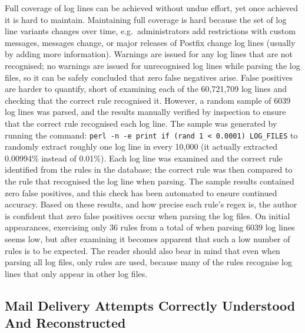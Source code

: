 Full coverage of log lines can be achieved without undue effort, yet once
achieved it is hard to maintain.  Maintaining full coverage is hard because
the set of log line variants changes over time, e.g.\ administrators add
restrictions with custom messages,  messages change, or
major releases of Postfix change log lines (usually by adding more
information).  Warnings are issued for any log lines that are not
recognised; no warnings are issued for unrecognised log lines while parsing
the \numberOFlogFILES{} log files, so it can be safely concluded that zero
false negatives arise.  False positives are harder to quantify, short of
examining each of the 60,721,709 log lines and checking that the correct
rule recognised it.  However, a random sample of 6039 log lines was parsed,
and the results manually verified by inspection to ensure that the correct
rule recognised each log line.  The sample was generated by running the
command: \texttt{perl -n -e \singlequote{}print if (rand 1 <
0.0001)\singlequote{} LOG\_FILES} to randomly extract roughly one log line
in every 10,000 (it actually extracted 0.00994\% instead of 0.01\%).  Each
log line was examined and the correct rule identified from the
\numberOFrules{} rules in the database; the correct rule was then compared
to the rule that recognised the log line when parsing.  The sample results
contained zero false positives, and this check has been automated to ensure
continued accuracy.  Based on these results, and how precise each rule's
regex is, the author is confident that zero false positives occur when
parsing the \numberOFlogFILES{} log files.  On initial appearances,
exercising only 36 rules from a total of \numberOFrules{} when parsing 6039
log lines seems low, but after examining  it
becomes apparent that such a low number of rules is to be expected.  The
reader should also bear in mind that even when parsing all
\numberOFlogFILES{} log files, only \numberOFrulesMINIMUM{} rules are used,
because many of the rules recognise log lines that only appear in other log
files.

\subsection{Mail Delivery Attempts Correctly Understood And Reconstructed}

\label{mails-covered}

